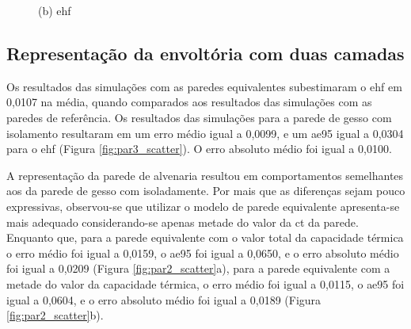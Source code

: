 \documentclass[brazil,hardcopy,openany]{ufscthesis} %
\newcommand{\figsize}{.6}
\begin{document}
\begin{figure}[h]
\begin{minipage}{.5\textwidth}
		\begin{center}
			\small{(b) \acrlong{ehf}}
		\end{center}
	\end{minipage}
	\label{fig:cpaverage_tempEHF_scatter}
\end{figure}

%

\subsection{Representação da envoltória com duas camadas}

Os resultados das simulações com as paredes equivalentes subestimaram o \acrshort{ehf} em 0,0107 na média, quando comparados aos resultados das simulações com as paredes de referência. 
Os resultados das simulações para a parede de gesso com isolamento resultaram em um erro médio igual a 0,0099, e um \acrshort{ae95} igual a 0,0304 para o \acrshort{ehf} (Figura \ref{fig:par3_scatter}). O erro absoluto médio foi igual a 0,0100.

A representação da parede de alvenaria resultou em comportamentos semelhantes aos da parede de gesso com isoladamente.
Por mais que as diferenças sejam pouco expressivas, observou-se que utilizar o modelo de parede equivalente apresenta-se mais adequado considerando-se apenas metade do valor da \acrfull{ct} da parede. Enquanto que, para a parede equivalente com o valor total da capacidade térmica o erro médio foi igual a 0,0159, o \acrshort{ae95} foi igual a 0,0650, e o erro absoluto médio foi igual a 0,0209 (Figura \ref{fig:par2_scatter}a), para a parede equivalente com a metade do valor da capacidade térmica, o erro médio foi igual a 0,0115, o \acrshort{ae95} foi igual a 0,0604, e o erro absoluto médio foi igual a 0,0189 (Figura \ref{fig:par2_scatter}b).
\end{document}
